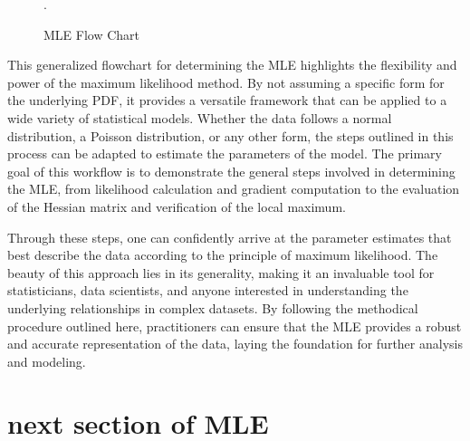 \documentclass[
  12 pt,
  a4paper,
]{book}
\numberwithin{equation}{section}
\theoremstyle{plain}      %
\theoremstyle{definition} %
\theoremstyle{remark}     %
\theoremstyle{note}         %
\begin{document}
\begin{figure}[htbp]
{
}
\caption{MLE Flow Chart}.
\label{fig:MLE_Flow-diagram}
\end{figure}

\newpage

This generalized flowchart for determining the MLE highlights the
flexibility and power of the maximum likelihood method. By not assuming
a specific form for the underlying PDF, it provides a versatile
framework that can be applied to a wide variety of statistical models.
Whether the data follows a normal distribution, a Poisson distribution,
or any other form, the steps outlined in this process can be adapted to
estimate the parameters of the model. The primary goal of this workflow
is to demonstrate the general steps involved in determining the MLE,
from likelihood calculation and gradient computation to the evaluation
of the Hessian matrix and verification of the local maximum.

Through these steps, one can confidently arrive at the parameter
estimates that best describe the data according to the principle of
maximum likelihood. The beauty of this approach lies in its generality,
making it an invaluable tool for statisticians, data scientists, and
anyone interested in understanding the underlying relationships in
complex datasets. By following the methodical procedure outlined here,
practitioners can ensure that the MLE provides a robust and accurate
representation of the data, laying the foundation for further analysis
and modeling.

\hypertarget{next-section-of-mle}{%
\section{next section of MLE}\label{next-section-of-mle}}
\end{document}

